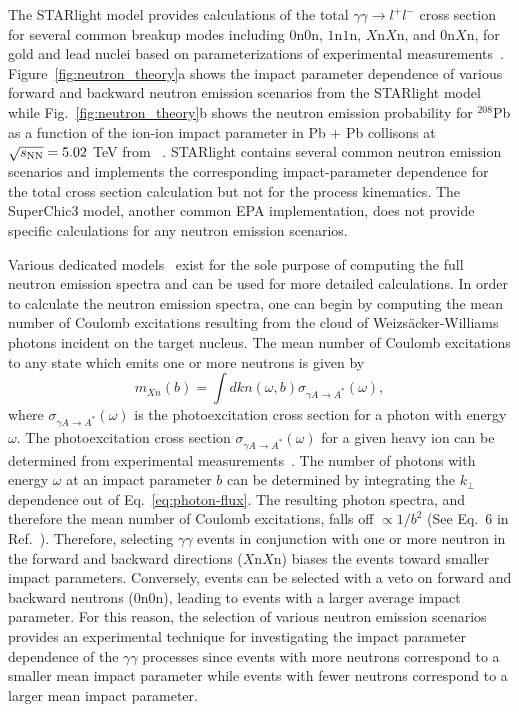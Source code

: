 \documentclass[12pt,epjc3]{svjour3}\sloppy
\begin{document}
The STARlight model provides calculations of the total $\gamma\gamma \rightarrow l^+l^-$ cross section for several common breakup modes including $0$n$0$n, $1$n$1$n, $X$n$X$n, and $0$n$X$n, for gold and lead nuclei based on parameterizations of experimental measurements~\cite{baltzHeavyionPartialBeam1996}. 
Figure~\ref{fig:neutron_theory}a shows the impact parameter dependence of various forward and backward neutron emission scenarios from the STARlight model while Fig.~\ref{fig:neutron_theory}b shows the neutron emission probability for $^{208}$Pb as a function of the ion-ion impact parameter in Pb + Pb collisons at $\sqrt{s_{\rm{NN}}} = 5.02$ TeV from ~\cite{brandenburgAcoplanarityQEDPairs2020b}. 
STARlight contains several common neutron emission scenarios and implements the corresponding impact-parameter dependence for the total cross section calculation but not for the process kinematics. The SuperChic3 model, another common EPA implementation, does not provide specific calculations for any neutron emission scenarios.

Various dedicated models~\cite{pshenichnovElectromagneticExcitationFragmentation2011,pshenichnovMutualHeavyIon2001a,brozGeneratorForwardNeutrons2020} exist for the sole purpose of computing the full neutron emission spectra and can be used for more detailed calculations. In order to calculate the neutron emission spectra, one can begin by computing the mean number of Coulomb excitations resulting from the cloud of Weizsäcker-Williams photons incident on the target nucleus.
The mean number of Coulomb excitations to any state which emits one or more neutrons is given by~\cite{brozGeneratorForwardNeutrons2020}
\begin{equation}
    \label{eq:prob1n}
    m_{Xn}(b) = \int dk n(\omega,b) \sigma_{\gamma A\rightarrow A^{*}}(\omega),
\end{equation}
where $\sigma_{\gamma A\rightarrow A^{*}}(\omega)$ is the photoexcitation cross section for a photon with energy $\omega$.
The photoexcitation cross section $\sigma_{\gamma A\rightarrow A^{*}}(\omega)$ for a given heavy ion can be determined from experimental measurements~\cite{veyssierePhotoneutronCrossSections1970,LEPRETRE1981237,CARLOS1984573,PhysRevD.5.1640,PhysRevD.7.1362,PhysRevLett.39.737,ARMSTRONG1972445}. 
The number of photons with energy $\omega$ at an impact parameter $b$ can be determined by integrating the $k_\perp$ dependence out of Eq.~\ref{eq:photon-flux}.  
The resulting photon spectra, and therefore the mean number of Coulomb excitations, falls off $\propto 1/b^2$ (See Eq.~6 in Ref.~\cite{brozGeneratorForwardNeutrons2020}). 
Therefore, selecting $\gamma\gamma$ events in conjunction with one or more neutron in the forward and backward directions ($X$n$X$n) biases the events toward smaller impact parameters.
Conversely, events can be selected with a veto on forward and backward neutrons ($0$n$0$n), leading to events with a larger average impact parameter.
For this reason, the selection of various neutron emission scenarios provides an experimental technique for investigating the impact parameter dependence of the $\gamma\gamma$ processes since events with more neutrons correspond to a smaller mean impact parameter while events with fewer neutrons correspond to a larger mean impact parameter.
\end{document}
